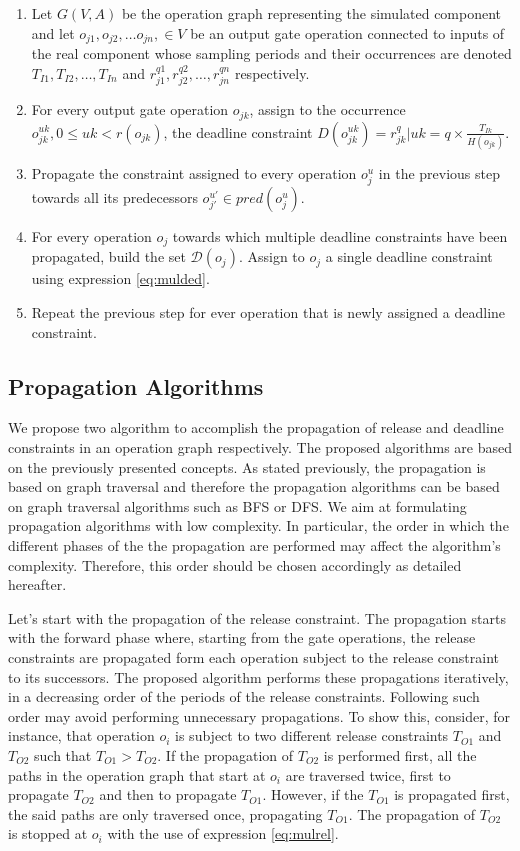 \begin{enumerate}
\item Let $G(V,A)$ be the operation graph representing the simulated component and let $o_{j1}, o_{j2}, \ldots o_{jn},\in  V$ be an output gate operation connected to inputs of the real component whose sampling periods and their occurrences are denoted $T_{I1}, T_{I2}, \ldots, T_{In}$ and $r_{j1}^{q1}, r_{j2}^{q2}, \ldots, r_{jn}^{qn}$ respectively.
\item For every output gate operation $o_{jk}$, assign to the occurrence $o_{jk}^{uk}, 0 \leq uk < r(o_{jk})$, the deadline constraint $D(o_{jk}^{uk}) = r_{jk}^q | uk = q \times \frac{T_{Ik}}{H(o_{jk})}$.
\item Propagate the constraint assigned to every operation $o_j^u$ in the previous step towards all its predecessors $o_{j'}^{u'} \in pred(o_j^u)$.
\item For every operation $o_j$ towards which multiple deadline constraints have been propagated, build the set $\mathcal{D}(o_j)$. Assign to $o_j$ a single deadline constraint using expression \ref{eq:mulded}.
\item Repeat the previous step for ever operation that is newly assigned a deadline constraint.
\end{enumerate}

\subsection{Propagation Algorithms}

We propose two algorithm to accomplish the propagation of release and deadline constraints in an operation graph respectively. The proposed algorithms are based on the previously presented concepts. As stated previously, the propagation is based on graph traversal and therefore the propagation algorithms can be based on graph traversal algorithms such as BFS or DFS. We aim at formulating propagation algorithms with low complexity. In particular, the order in which the different phases of the the propagation are performed may affect the algorithm's complexity. Therefore, this order should be chosen accordingly as detailed hereafter.

Let's start with the propagation of the release constraint. The propagation starts with the forward phase where, starting from the gate operations, the release constraints are propagated form each operation subject to the release constraint to its successors. The proposed algorithm performs these propagations iteratively, in a decreasing order of the periods of the release constraints. Following such order may avoid performing unnecessary propagations. To show this, consider, for instance, that operation $o_i$ is subject to two different release constraints $T_{O1}$ and $T_{O2}$ such that $T_{O1} > T_{O2}$. If the propagation of $T_{O2}$ is performed first, all the paths in the operation graph that start at $o_i$ are traversed twice, first to propagate $T_{O2}$ and then to propagate $T_{O1}$. However, if the $T_{O1}$ is propagated first, the said paths are only traversed once, propagating $T_{O1}$. The propagation of $T_{O2}$ is stopped at $o_i$ with the use of expression \ref{eq:mulrel}.

